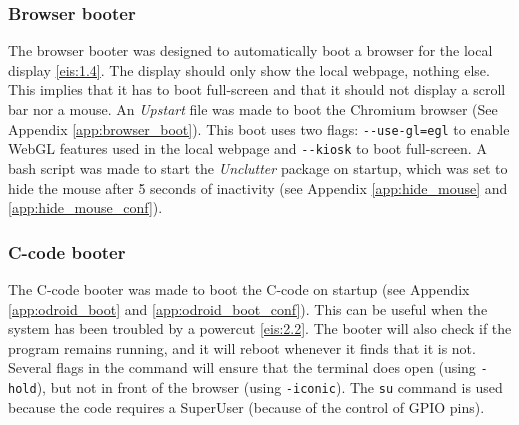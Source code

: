 \subsubsection{Browser booter}
The browser booter was designed to automatically boot a browser for the local display \ref{eis:1.4}. The display should only show the local webpage, nothing else. This implies that it has to boot full-screen and that it should not display a scroll bar nor a mouse. An \textit{Upstart} file was made to boot the Chromium browser (See Appendix \ref{app:browser_boot}). This boot uses two flags: \verb|--use-gl=egl| to enable WebGL features used in the local webpage and \verb|--kiosk| to boot full-screen. A bash script was made to start the \textit{Unclutter} \cite{unclutter} package on startup, which was set to hide the mouse after 5 seconds of inactivity (see Appendix \ref{app:hide_mouse} and \ref{app:hide_mouse_conf}). 

\subsubsection{C-code booter}
The C-code booter was made to boot the C-code on startup (see Appendix \ref{app:odroid_boot} and \ref{app:odroid_boot_conf}). This can be useful when the system has been troubled by a powercut \ref{eis:2.2}. The booter will also check if the program remains running, and it will reboot whenever it finds that it is not. Several flags in the command will ensure that the terminal does open (using \verb|-hold|), but not in front of the browser (using \verb|-iconic|). The \verb|su| command is used because the code requires a SuperUser (because of the control of GPIO pins).